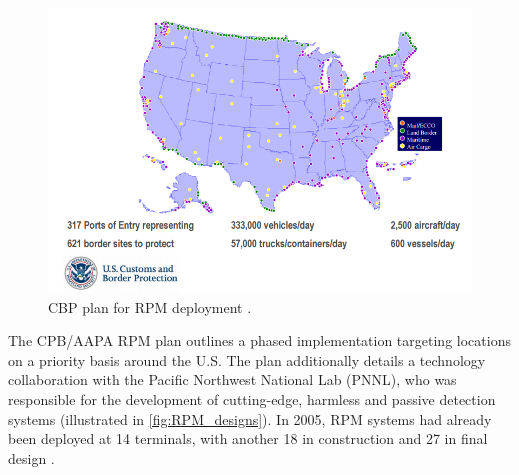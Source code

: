\documentclass{report}
\begin{document}
\begin{figure}[h]
 \centering
 \includegraphics[trim = 0cm 0cm 0cm 0cm, clip,scale=0.55]{./figures/RPM_map.png}
   \caption{CBP plan for RPM deployment \cite{Simmons2005}.}
     \label{fig:RPM_map}
\end{figure}


The CPB/AAPA RPM plan outlines a phased implementation targeting locations on a priority basis around the U.S. The plan additionally details a technology collaboration with the Pacific Northwest National Lab (PNNL), who was responsible for the development of cutting-edge, harmless and passive detection systems (illustrated in \autoref{fig:RPM_designs}). In 2005, RPM systems had already been deployed at 14 terminals, with another 18 in construction and 27 in final design \cite{Simmons2005}.
\end{document}
